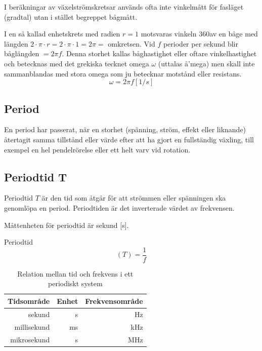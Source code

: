 I beräkningar av växelströmskretsar används ofta inte vinkelmått för fasläget
(gradtal) utan i stället begreppet bågmått.

I en så kallad enhetskrets med radien \(r = 1\) motsvaras vinkeln 360\degree av en
båge med längden \(2 \cdot \pi \cdot r= 2 \cdot \pi \cdot 1 = 2 \pi =\)
omkretsen.
Vid \(f\) perioder per sekund blir båglängden \(= 2\pi f\).
Denna storhet kallas båghastighet eller oftare vinkelhastighet och betecknas
med det grekiska tecknet omega \(\omega\) (uttalas å'mega) men skall
inte sammanblandas med stora omega som ju betecknar motstånd eller resistans.
\[   \omega= 2\pi f \unit{[1/s]}   \]

\subsection{Period}

En period har passerat, när en storhet (spänning, ström, effekt eller
liknande) återtagit samma tillstånd eller värde efter att ha gjort en
fullständig växling, till exempel en hel pendelrörelse eller ett helt
varv vid rotation.

\subsection{Periodtid T}

Periodtid \(T\) är den tid som åtgår för att strömmen eller spänningen
ska genomlöpa en period. Periodtiden är det inverterade värdet av
frekvensen.

Måttenheten för periodtid är sekund [s].

Periodtid
\[   (T) = \dfrac{1}{f}   \]

\begin{table}[h]
  \centering
    \begin{tabular}{rrr}
	         Tidsområde & Enhet     & Frekvensområde \\ \hline
		     sekund & s         & Hz             \\
		millisekund & ms        & kHz            \\
		mikrosekund & \textmu s & MHz
	\end{tabular}
	\caption{Relation mellan tid och frekvens i ett periodiskt system}
\end{table}

